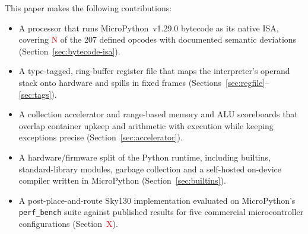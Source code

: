 This paper makes the following contributions:
\begin{itemize}
  \item A processor that runs MicroPython~v1.29.0 bytecode as its native ISA, covering
        \textcolor{red}{N} of the 207 defined opcodes with documented
        semantic deviations (Section~\ref{sec:bytecode-isa}).
  \item A type-tagged, ring-buffer register file that maps the
        interpreter's operand stack onto hardware and spills in fixed
        frames (Sections~\ref{sec:regfile}--\ref{sec:tags}).
  \item A collection accelerator and range-based memory and ALU scoreboards
        that overlap container upkeep and arithmetic with execution
        while keeping exceptions precise (Section~\ref{sec:accelerator}).
  \item A hardware/firmware split of the Python runtime, including builtins,
        standard-library modules, garbage collection and a self-hosted
        on-device compiler written in MicroPython (Section~\ref{sec:builtins}).
  \item A post-place-and-route Sky130 implementation evaluated on
        MicroPython's \texttt{perf\_bench} suite against published results
        for five commercial microcontroller configurations (Section~\textcolor{red}{X}).
\end{itemize}

